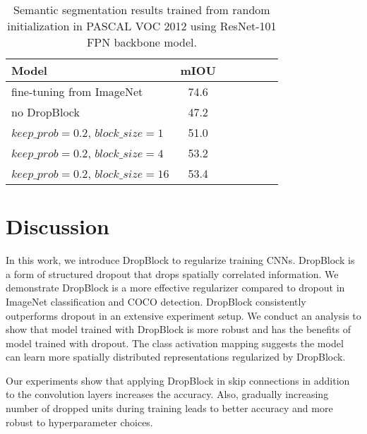 \documentclass{article}
\begin{document}
\begin{table}[h!]
\setlength{\tabcolsep}{8pt}
\begin{center}
\small
\begin{tabular}{l|cccccc}
\hline
  \footnotesize Model  & \footnotesize mIOU \\
\hline \hline
\footnotesize fine-tuning from ImageNet & 74.6  \\
\hline
\footnotesize no DropBlock               & 47.2\\
\footnotesize $keep\_prob=0.2$, $block\_size=1$  & 51.0 \\
\footnotesize $keep\_prob=0.2$, $block\_size=4$  & 53.2 \\
\footnotesize $keep\_prob=0.2$, $block\_size=16$  & 53.4 \\
\hline
\end{tabular}
\end{center}
\caption{Semantic segmentation results trained from random initialization in PASCAL VOC 2012 using ResNet-101 FPN backbone model.}
\label{table:retinanetseg}
\end{table}

\section{Discussion}
In this work, we introduce DropBlock to regularize training CNNs. DropBlock is a form of structured dropout that drops spatially correlated information. We demonstrate DropBlock is a more effective regularizer compared to dropout in ImageNet classification and COCO detection. DropBlock consistently outperforms dropout in an extensive experiment setup. We conduct an analysis to show that model trained with DropBlock is more robust and has the benefits of model trained with dropout. The class activation mapping suggests the model can learn more spatially distributed representations regularized by DropBlock.

Our experiments show that applying DropBlock in skip connections in addition to the convolution layers increases the accuracy. Also, gradually increasing number of dropped units during training leads to better accuracy and more robust to hyperparameter choices.


\small


\end{document}
